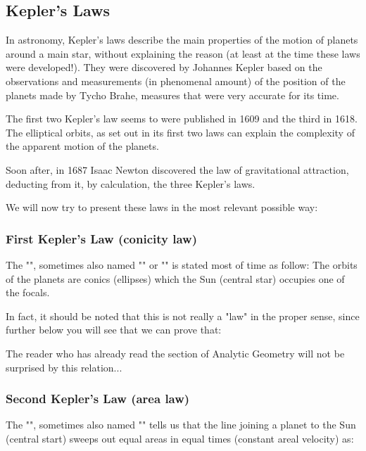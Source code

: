 	\subsection{Kepler's Laws}\label{kepler laws}
	In astronomy, Kepler's laws describe the main properties of the motion of planets around a main star, without explaining the reason (at least at the time these laws were developed!). They were discovered by Johannes Kepler based on the observations and measurements (in phenomenal amount) of the position of the planets made by Tycho Brahe, measures that were very accurate for its time.
	
	The first two Kepler's law seems to were published in 1609 and the third in 1618. The elliptical orbits, as set out in its first two laws can explain the complexity of the apparent motion of the planets.
	
	Soon after, in 1687 Isaac Newton discovered the law of gravitational attraction, deducting from it, by calculation, the three Kepler's laws.
	
	We will now try to present these laws in the most relevant possible way:
	
	\subsubsection{First Kepler's Law (conicity law)}\label{conicity law}
	The "", sometimes also named "" or "" is stated most of time as follow: The orbits of the planets are conics (ellipses) which the Sun (central star) occupies one of the focals.
	
	In fact, it should be noted that this is not really a "law" in the proper sense, since further below you will see that we can prove that:
	
	
	\begin{tcolorbox}[title=Remark,colframe=black,arc=10pt]
	The reader who has already read the section of Analytic Geometry will not be surprised by this relation...
	\end{tcolorbox}
	
	\subsubsection{Second Kepler's Law (area law)}
	The "\label{kepler second law}", sometimes also named "" tells us that the line joining a planet to the Sun (central start) sweeps out equal areas in equal times (constant areal velocity\label{constant areal velocity}) as:
	
